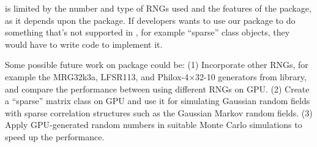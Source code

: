 \documentclass[article,nojss]{jss}\usepackage[]{graphicx}\usepackage[]{color}
\begin{document}

 is limited by the number and type of  RNGs used and the features of the  package, as it depends upon the  package. If developers wants to use our package to do something that's not supported in , for example ``sparse'' class objects, they would have to write  code to implement it.

Some possible future work on  package could be: (1) Incorporate other RNGs, for example the MRG32k3a, LFSR113, and Philox-4×32-10 generators from  library, and compare the  performance between using different RNGs on GPU. (2) Create a ``sparse'' matrix class on GPU and use it for simulating Gaussian random fields with sparse correlation structures such as the Gaussian Markov random fields. (3) Apply GPU-generated random numbers in suitable Monte Carlo simulations to speed up the performance.







\newpage












\begin{appendix}

\end{appendix}
\end{document}
